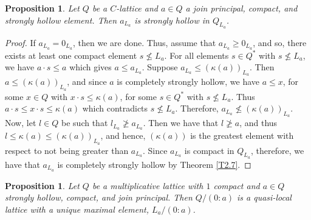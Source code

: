 \documentclass[11pt,english]{amsart}
\newtheorem{proposition}[theorem]{Proposition}
\theoremstyle{definition}
\numberwithin{equation}{section}
\theoremstyle{remark}
\def\leq{\leqslant}
\begin{document}
	\begin{proposition}\label{T2.13}
		Let $Q$ be a $C$-lattice and $a\in Q$ a join principal, compact, and strongly hollow element. Then $a_{L_a}$ is strongly hollow in $Q_{L_a}$. 
	\end{proposition}
	
	\begin{proof}
		If $a_{L_a}=0_{L_a}$, then we are done. Thus, assume that $a_{L_a}\geqslant0_{L_a}$, and so, there exists at least one compact element $s\nleq L_a$. For all elements $s\in Q^*$ with $s\nleq L_a$, we have $a\cdot s\leq a$ which gives $a\leq a_{L_a}$. Suppose $a_{L_a}\leq (\kappa(a))_{L_a}$. Then $a\leq(\kappa(a))_{L_a}$, and since $a$ is completely strongly hollow, we have $a\leq x$, for some $x\in Q$ with $x\cdot s\leq\kappa(a)$, for some $s\in Q^*$ with $s\nleq L_a$. Thus $a\cdot s\leq x\cdot s\leq\kappa(a)$ which contradicts $s\nleq L_a$. Therefore, $a_{L_a}\nleq(\kappa(a))_{L_a}$. Now, let $l\in Q$  be such that $l_{L_a}\ngeq a_{L_a}$. Then we have that $l\ngeq a$, and thus $l\leq \kappa(a)\leq (\kappa(a))_{L_a}$, and hence, $(\kappa(a))$ is the greatest element with respect to not being greater than $a_{L_a}$. Since $a_{L_a}$ is compact in $Q_{L_a}$, therefore, we have that $a_{L_a}$ is completely strongly hollow by Theorem \ref{T2.7}.
	\end{proof}
	
	\begin{proposition}\label{T2.14}
		Let $Q$ be a multiplicative lattice with $1$ compact and $a\in Q$ strongly hollow, compact, and join principal. Then $Q/(0:a)$ is a quasi-local lattice with a unique maximal element, $L_a/(0:a)$.
	\end{proposition}
	
\end{document}
